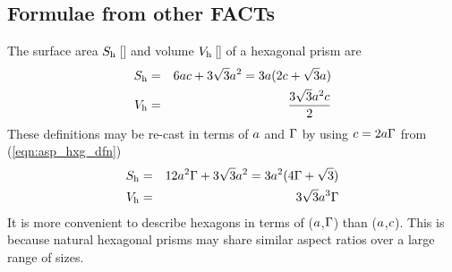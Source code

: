 \documentclass[12pt,twoside]{article}
\begin{document}
\subsection[Formulae from other FACTs]{Formulae from other FACTs}\label{sxn:fct}
The surface area $S_{\mathrm{h}}$\,[\mS] and volume $V_{\mathrm{h}}$\,[\mC] of a 
hexagonal prism are
\begin{eqnarray}
S_{\mathrm{h}} & = & 6ac+3\sqrt{3}a^{2} = 
              3a(2c+\sqrt{3}a) \\
\label{eqn:sfc_hxg_dfn}
V_{\mathrm{h}} & = & \frac{3\sqrt{3}a^{2}c}{2}
\label{eqn:vlm_hxg_dfn}
\end{eqnarray}
These definitions may be re-cast in terms of $a$ and $\Gamma$
by using $c = 2a\Gamma$ from (\ref{eqn:asp_hxg_dfn})  
\begin{eqnarray}
S_{\mathrm{h}} & = & 12a^{2}\Gamma+3\sqrt{3}a^{2} = 
              3a^{2}(4\Gamma+\sqrt{3}) \\
\label{eqn:sfc_hxg_asp_dfn}
V_{\mathrm{h}} & = & 3\sqrt{3}a^{3}\Gamma
\label{eqn:vlm_hxg_asp_dfn}
\end{eqnarray}
It is more convenient to describe hexagons in terms
of ($a$,$\Gamma$) than ($a$,$c$).
This is because natural hexagonal prisms may share similar aspect
ratios over a large range of sizes.
\end{document}
